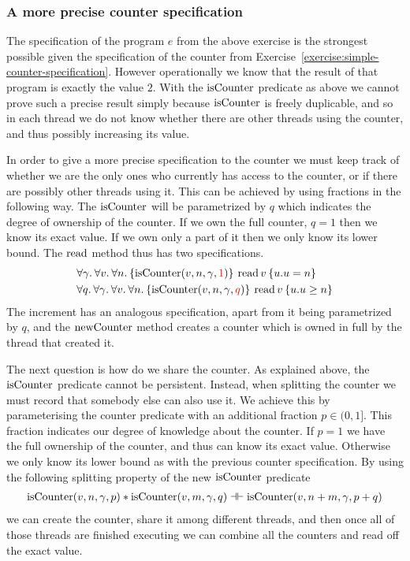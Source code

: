 \subsubsection*{A more precise counter specification}

The specification of the program $e$ from the above exercise is the strongest possible given the specification of the counter from Exercise~\ref{exercise:simple-counter-specification}.
However operationally we know that the result of that program is exactly the value $2$.
With the $\operatorname{isCounter}$ predicate as above we cannot prove such a precise result simply because $\operatorname{isCounter}$ is freely duplicable, and so in each thread we do not know whether there are other threads using the counter, and thus possibly increasing its value.

In order to give a more precise specification to the counter we must keep track of whether we are the only ones who currently has access to the counter, or if there are possibly other threads using it.
This can be achieved by using fractions in the following way.
The $\operatorname{isCounter}$ will be parametrized by $q$ which indicates the degree of ownership of the counter.
If we own the full counter, \ie{} $q = 1$ then we know its exact value.
If we own only a part of it then we only know its lower bound.
The $\operatorname{read}$ method thus has two specifications.
\begin{align*}
  &\All \gamma . \All v . \All n . \hoare{\isCounter(v, n, \gamma, {\color{red} 1})}{\readC v}{u.u = n}\\
  &\All q . \All \gamma . \All v . \All n . \hoare{\isCounter(v, n, \gamma, {\color{red} q})}{\readC v}{u.u \geq n}
\end{align*}
The increment has an analogous specification, apart from it being parametrized by $q$, and the $\operatorname{newCounter}$ method creates a counter which is owned in full by the thread that created it.

The next question is how do we share the counter.
As explained above, the $\operatorname{isCounter}$ predicate cannot be persistent.
Instead, when splitting the counter we must record that somebody else can also use it.
We achieve this by parameterising the counter predicate with an additional fraction $p \in (0, 1]$.
This fraction indicates our degree of knowledge about the counter.
If $p=1$ we have the full ownership of the counter, and thus can know its exact value.
Otherwise we only know its lower bound as with the previous counter specification.
By using the following splitting property of the new $\operatorname{isCounter}$ predicate
\begin{align*}
  \operatorname{isCounter}(v, n, \gamma, p) \ast \operatorname{isCounter}(v, m, \gamma, q) \mathrel{\dashv\vdash} \operatorname{isCounter}(v, n + m, \gamma, p + q)
\end{align*}
we can create the counter, share it among different threads, and then once all of those threads are finished executing we can combine all the counters and read off the exact value.

